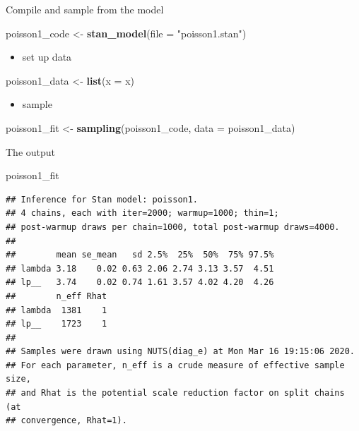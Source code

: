 \documentclass[
  ignorenonframetext,
]{beamer}
\newenvironment{Shaded}{\begin{snugshade}}{\end{snugshade}}
\newcommand{\DataTypeTok}[1]{\textcolor[rgb]{0.13,0.29,0.53}{#1}}
\newcommand{\KeywordTok}[1]{\textcolor[rgb]{0.13,0.29,0.53}{\textbf{#1}}}
\newcommand{\NormalTok}[1]{#1}
\newcommand{\StringTok}[1]{\textcolor[rgb]{0.31,0.60,0.02}{#1}}
\providecommand{\tightlist}{%
  \setlength{\itemsep}{0pt}\setlength{\parskip}{0pt}}
\begin{document}
\begin{frame}[fragile]{Compile and sample from the model}
\protect\hypertarget{compile-and-sample-from-the-model}{}

\begin{Shaded}
\begin{Highlighting}[]
\NormalTok{poisson1_code <-}\StringTok{ }\KeywordTok{stan_model}\NormalTok{(}\DataTypeTok{file =} \StringTok{"poisson1.stan"}\NormalTok{)}
\end{Highlighting}
\end{Shaded}

\begin{itemize}
\tightlist
\item
  set up data
\end{itemize}

\begin{Shaded}
\begin{Highlighting}[]
\NormalTok{poisson1_data <-}\StringTok{ }\KeywordTok{list}\NormalTok{(}\DataTypeTok{x =}\NormalTok{ x)}
\end{Highlighting}
\end{Shaded}

\begin{itemize}
\tightlist
\item
  sample
\end{itemize}

\begin{Shaded}
\begin{Highlighting}[]
\NormalTok{poisson1_fit <-}\StringTok{ }\KeywordTok{sampling}\NormalTok{(poisson1_code, }\DataTypeTok{data =}\NormalTok{ poisson1_data)}
\end{Highlighting}
\end{Shaded}

\end{frame}

\begin{frame}[fragile]{The output}
\protect\hypertarget{the-output-1}{}

\begin{Shaded}
\begin{Highlighting}[]
\NormalTok{poisson1_fit}
\end{Highlighting}
\end{Shaded}

\begin{verbatim}
## Inference for Stan model: poisson1.
## 4 chains, each with iter=2000; warmup=1000; thin=1; 
## post-warmup draws per chain=1000, total post-warmup draws=4000.
## 
##        mean se_mean   sd 2.5%  25%  50%  75% 97.5%
## lambda 3.18    0.02 0.63 2.06 2.74 3.13 3.57  4.51
## lp__   3.74    0.02 0.74 1.61 3.57 4.02 4.20  4.26
##        n_eff Rhat
## lambda  1381    1
## lp__    1723    1
## 
## Samples were drawn using NUTS(diag_e) at Mon Mar 16 19:15:06 2020.
## For each parameter, n_eff is a crude measure of effective sample size,
## and Rhat is the potential scale reduction factor on split chains (at 
## convergence, Rhat=1).
\end{verbatim}

\end{frame}
\end{document}
